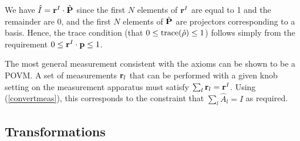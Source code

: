 \documentclass[12pt]{article}
\begin{document}
We have $\hat{I}={\bf r}^I\cdot\hat{\bf P}$ since the first $N$ elements
of ${\bf r}^I$ are equal to 1 and the remainder are 0, and the first $N$
elements of $\hat{\bf P}$ are projectors corresponding to a basis.
Hence, the trace condition (that $0\leq{\rm trace} (\hat{\rho})\leq 1$)
follows simply from the requirement $0\leq{\bf r}^I\cdot{\bf p}\leq 1$.

The most general measurement consistent with the axioms can be shown to
be a POVM.  A set of measurements ${\bf r}_l$ that can be performed with
a given knob setting on the measurement apparatus must satisfy
$\sum_l {\bf r}_l = {\bf r}^I$.  Using (\ref{convertmeas}), this
corresponds to the constraint that $\sum_l \hat{A}_l = I$ as required.

\subsection{Transformations}
\end{document}

